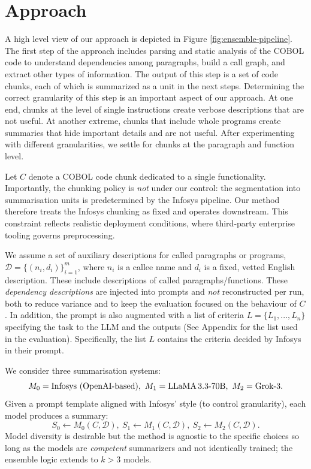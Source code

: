\section{Approach}

A high level view of our approach is depicted in Figure \ref{fig:ensemble-pipeline}. The first step of the approach includes parsing and static analysis of the COBOL code to understand dependencies among paragraphs, build a call graph, and extract other types of information. 
The output of this step is a set of code chunks, each of which is summarized as a unit in the next steps. Determining the correct granularity of this step is an important aspect of our approach. At one end, chunks at the level of single instructions create verbose descriptions that are not useful. At another extreme, chunks that include whole programs create summaries that hide important details and are not useful. After experimenting with different granularities, we settle for chunks at the paragraph and function level.



Let $C$ denote a COBOL code chunk dedicated to a single functionality. Importantly, the chunking policy is 
\emph{not} under our control: the segmentation into summarisation units 
is predetermined by the Infosys pipeline. Our method therefore treats the 
Infosys chunking as fixed and operates downstream. This constraint reflects 
realistic deployment conditions, where third-party enterprise tooling 
governs preprocessing. 

We assume a set of auxiliary descriptions for called paragraphs or 
programs, $\mathcal{D}=\{(n_i, d_i)\}_{i=1}^{m}$, where $n_i$ is a callee 
name and $d_i$ is a fixed, vetted English description. These include descriptions of called paragraphs/functions. These 
\emph{dependency descriptions} are injected into prompts and 
\emph{not} reconstructed per run, both to reduce variance and to keep the 
evaluation focused on the behaviour of $C$. In addition, the prompt is also augmented with  a list of criteria $L = \{L_1, ..., L_n\}$ specifying the task to the LLM and the outputs (See Appendix for the list used in the evaluation). Specifically, the list $L$ contains the criteria decided by Infosys in their prompt. 

We consider three summarisation systems:
\[
M_0=\text{Infosys (OpenAI-based)},\ 
M_1=\text{LLaMA\,3.3-70B},\ 
M_2=\text{Grok-3}.
\]
Given a prompt template aligned with Infosys’ style (to control 
granularity), each model produces a summary:
\[
S_0 \leftarrow M_0(C,\mathcal{D}),\ 
S_1 \leftarrow M_1(C,\mathcal{D}),\ 
S_2 \leftarrow M_2(C,\mathcal{D}).
\]
Model diversity is desirable but the method is agnostic to the specific
choices so long as the models are \emph{competent} summarizers and not
identically trained; the ensemble logic extends to $k>3$ models.

